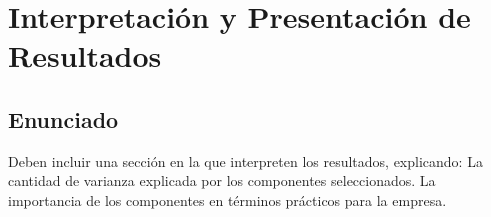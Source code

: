 \newpage
\section{Interpretación y Presentación de Resultados}
\subsection{Enunciado}
Deben incluir una sección en la que interpreten los resultados, explicando:
La cantidad de varianza explicada por los componentes seleccionados.
La importancia de los componentes en términos prácticos para la empresa.
